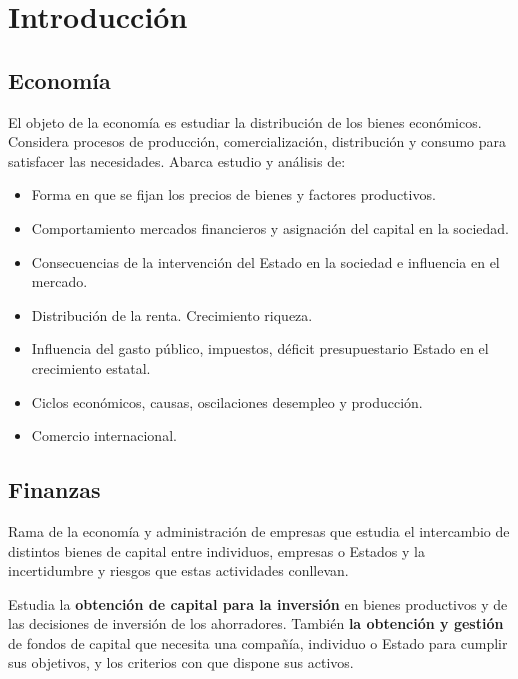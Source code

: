 \documentclass[
10pt, %
a4paper, %
oneside, %
headinclude,footinclude, %
BCOR5mm, %
]{scrartcl}
\newcommand{\n}[1]{\textbf{#1}}
\newcounter{ex}
\begin{document}
\pagestyle{scrheadings} %

\newpage
\tableofcontents
\newpage




\section*{Introducción}

	\subsection*{Economía}
		El objeto de la economía es estudiar la distribución de los bienes económicos. Considera procesos de producción, comercialización, distribución y consumo para satisfacer las necesidades. Abarca estudio y análisis de:
		\begin{itemize}
			\item Forma en que se fijan los precios de bienes y factores productivos.
			\item Comportamiento mercados financieros y asignación del capital en la sociedad.
			\item Consecuencias de la intervención del Estado en la sociedad e influencia en el mercado.
			\item Distribución de la renta. Crecimiento riqueza.
			\item Influencia del gasto público, impuestos, déficit presupuestario Estado en el crecimiento estatal.
			\item Ciclos económicos, causas, oscilaciones desempleo y producción.
			\item Comercio internacional.
		\end{itemize}

	\subsection*{Finanzas}

		Rama de la economía y administración de empresas que estudia el intercambio de distintos bienes de capital entre individuos, empresas o Estados y la incertidumbre y riesgos que estas actividades conllevan.

		Estudia la \n{obtención de capital para la inversión} en bienes productivos y de las decisiones de inversión de los ahorradores. También \n{la obtención y gestión} de fondos de capital que necesita una compañía, individuo o Estado para cumplir sus objetivos, y los criterios con que dispone sus activos.
\end{document}
